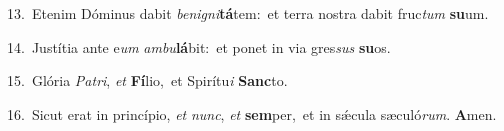 {\numbfont\textcolor{\numbcolor}{13.}}~Etenim Dóminus dabit \textit{be}\-\textit{ni}\textit{gni}\textbf{tá}tem:~\star et terra nostra dabit fruc\textit{tum} \textbf{su}\-um.\par
{\numbfont\textcolor{\numbcolor}{14.}}~Justítia ante e\textit{um} \textit{am}\-\textit{bu}\textbf{lá}bit:~\star et ponet in via gres\textit{sus} \textbf{su}\-os.\par
{\numbfont\textcolor{\numbcolor}{15.}}~Glória \textit{Pa}\-\textit{tri}, \textit{et} \textbf{Fí}\-lio,~\star et Spirítu\textit{i} \textbf{Sanc}\-to.\par
{\numbfont\textcolor{\numbcolor}{16.}}~Sicut erat in princípio, \textit{et} \textit{nunc}\-, \textit{et} \textbf{sem}\-per,~\star et in sǽcula sæculó\-\textit{rum}\-. \textbf{A}\-men.\par
